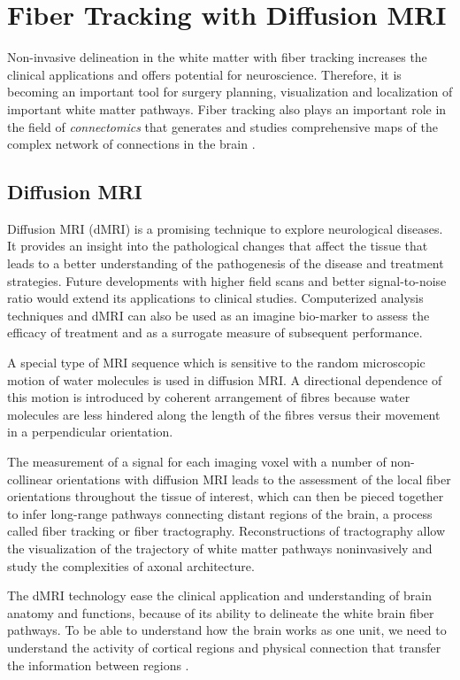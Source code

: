 \documentclass[../structure.tex]{subfiles}
\begin{document}
\section{Fiber Tracking with Diffusion MRI}
Non-invasive delineation in the white matter with fiber tracking increases the clinical applications and offers potential for neuroscience. Therefore, it is becoming an important tool for surgery planning, visualization and localization of important white matter pathways. Fiber tracking also plays an important role in the field of \textit{connectomics} that generates and studies comprehensive maps of the complex network of connections in the brain \cite{Jeurissen_2017}.

\subsection{Diffusion MRI}

Diffusion MRI (dMRI) is a promising technique to explore neurological diseases.  It provides an insight into the pathological changes that affect the tissue that leads to a better understanding of the pathogenesis of the disease and treatment strategies. Future developments with higher field scans and better signal-to-noise ratio would extend its applications to clinical studies. Computerized analysis techniques and dMRI can also be used as an imagine bio-marker to assess the efficacy of treatment and as a surrogate measure of subsequent performance.

A special type of MRI sequence which is sensitive to the random microscopic motion of water molecules is used in diffusion MRI. A directional dependence of this motion is introduced by coherent arrangement of fibres because water molecules are less hindered along the length of the fibres versus their movement in a perpendicular orientation. 

The measurement of a signal for each imaging voxel with a number of non-collinear orientations with diffusion MRI leads to the assessment of the local fiber orientations throughout the tissue of interest, which can then be pieced together to infer long-range pathways connecting distant regions of the brain, a process called fiber tracking or fiber tractography. Reconstructions of tractography allow the visualization of the trajectory of white matter pathways noninvasively and study the complexities of axonal architecture. 

The dMRI technology ease the clinical application and understanding of brain anatomy and functions, because of its ability to delineate the white brain fiber pathways. To be able to understand how the brain works as one unit, we need to understand the activity of cortical regions and physical connection that transfer the information between regions \cite{Jeurissen_2017}.
\end{document}
